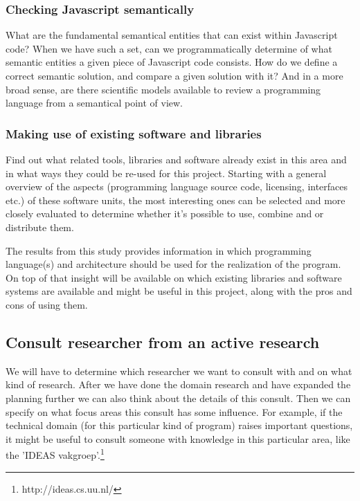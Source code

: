 \documentclass{article}
\begin{document}
\begin{itemize}
\subsubsection{Checking Javascript semantically}
What are the fundamental semantical entities that can exist within Javascript code? When we have such a set, can we programmatically determine of what semantic entities a given piece of Javascript code consists. How do we define a correct semantic solution, and compare a given solution with it? And in a more broad sense, are there scientific models available to review a programming language from a semantical point of view.
\subsubsection{Making use of existing software and libraries}
Find out what related tools, libraries and software already exist in this area and in what ways they could be re-used for this project. Starting with a general overview of the aspects (programming language source code, licensing, interfaces etc.) of these software units, the most interesting ones can be selected and more closely evaluated to determine whether it's possible to use, combine and or distribute them.

The results from this study provides information in which programming language(s) and architecture should be used for the realization of the program. On top of that insight will be available on which existing libraries and software systems are available and might be useful in this project, along with the pros and cons of using them.

\subsection{Consult researcher from an active research}
We will have to determine which researcher we want to consult with and on what kind of research. After we have done the domain research and have expanded the planning further we can also think about the details of this consult. Then we can specify on what focus areas this consult has some influence. For example, if the technical domain (for this particular kind of program) raises important questions, it might be useful to consult someone with knowledge in this particular area, like the 'IDEAS vakgroep'.\footnote{http://ideas.cs.uu.nl/}\\


\end{itemize}
\end{document}
